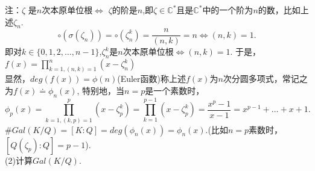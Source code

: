 \documentclass[UTF8]{article}
\begin{document}
注：$\zeta$ 是$n$次本原单位根$\Leftrightarrow$ $\zeta$的阶是$n$,即$\zeta\in \mathbb{C}^{*}$且是$\mathbb{C}^{*}$中的一个阶为$n$的数，比如上述$\zeta_n$.\\
$$\circ(\sigma(\zeta_n))=\circ(\zeta_n^k)=\frac{n}{(n,k)}=n\Leftrightarrow(n,k)=1.$$
即对$k\in\{0,1,2,\ldots,n-1\}$,$\zeta_n^k$是$n$次本原单位根$\Leftrightarrow$$(n,k)=1$.
于是，$f(x)=\prod \limits_{k=1,(n,k)=1}^n(x-\zeta_n^k) $\\%
显然，$deg(f(x))=\phi(n)$(Euler函数)称上述$f(x)$为$n$次分圆多项式，常记之为$f(x)\doteq \phi_n(x)$,
特别地，当$n=p$是一个素数时，
$$\phi_p(x)=\prod \limits_{k=1,(k,p)=1}^p(x-\zeta_p^k)=\prod\limits_{k=1}^{p-1}(x-\zeta_p^k)=\frac{x^{p}-1}{x-1}=x^{p-1}+\ldots +x+1.$$
$\#Gal(K/Q)=[K:Q]=deg(\phi_n(x))=\phi_n(x).$(比如$n=p$素数时，$[Q(\zeta_p):Q]=p-1$).\\


(2)计算$Gal(K/Q)$.
\end{document}
